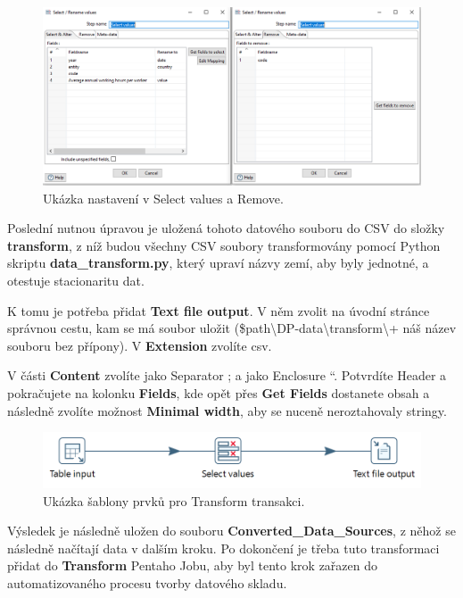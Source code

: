 \documentclass[thesis=M,czech]{FITthesis}[2022/10/08]
\begin{document}
\begin{figure}
    \centering
    \includegraphics[width=\textwidth]{DP-obrazky/select_values.png}
    \caption{Ukázka nastavení v Select values a Remove.}
    \label{fig:Select_vals}
\end{figure}

Poslední nutnou úpravou je uložená tohoto datového souboru do CSV do složky \textbf{transform}, z níž budou všechny CSV soubory transformovány pomocí Python skriptu \textbf{data\_transform.py}, který upraví názvy zemí, aby byly jednotné, a otestuje stacionaritu dat.

K tomu je potřeba přidat \textbf{Text file output}. V něm zvolit na úvodní stránce správnou cestu, kam se má soubor uložit (\${path}\textbackslash DP-data\textbackslash transform\textbackslash + náš název souboru bez přípony). V \textbf{Extension} zvolíte csv. 

V části \textbf{Content} zvolíte jako Separator ; a jako Enclosure “. Potvrdíte Header a pokračujete na kolonku \textbf{Fields}, kde opět přes \textbf{Get Fields} dostanete obsah a následně zvolíte možnost \textbf{Minimal width}, aby se nuceně neroztahovaly stringy.

\begin{figure}
    \centering
    \includegraphics[width=\textwidth]{DP-obrazky/transform_sablona.png}
    \caption{Ukázka šablony prvků pro Transform transakci.}
    \label{fig:Transform_šablona}
\end{figure}

Výsledek je následně uložen do souboru \textbf{Converted\_Data\_Sources}, z něhož se následně načítají data v dalším kroku. Po dokončení je třeba tuto transformaci přidat do \textbf{Transform} Pentaho Jobu, aby byl tento krok zařazen do automatizovaného procesu tvorby datového skladu.
\end{document}
